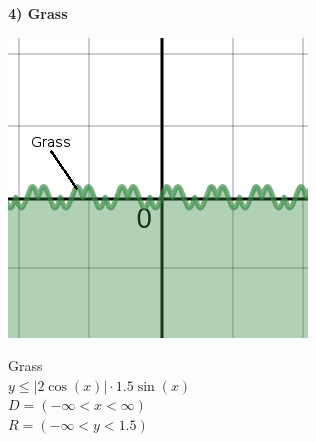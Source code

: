 \documentclass[12pt]{article}
\begin{document}
\begin{center}
\begin{large}
\textbf{4) Grass}\\
\end{large}
\includegraphics{grass}

{
Grass\\
$y\le\left|2\cos\left(x\right)\right|\cdot1.5\sin\left(x\right)$\\
$D = (-\infty < x < \infty)$\\
$R = (-\infty < y < 1.5)$\\
\bigbreak
}
\end{center}
\end{document}
